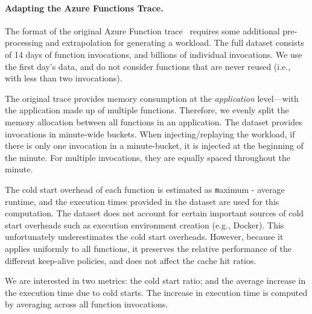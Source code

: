 \paragraph{Adapting the Azure Functions Trace.}
The format of the original Azure Function trace~\cite{shahrad_serverless_2020} requires some additional pre-processing and extrapolation for generating a workload.  
The full dataset consists of 14 days of function invocations, and billions of individual invocations. We use the first day's data, and do not consider functions that are never reused (i.e., with less than two invocations). 

The original trace provides memory consumption at the \textit{application} level---with the application made up of multiple functions.
Therefore, we evenly split the memory allocation between all functions in an application.
The dataset provides invocations in minute-wide buckets.
When injecting/replaying the workload, if there is only one invocation in a minute-bucket, it is injected at the beginning of the minute. 
For multiple invocations, they are equally spaced throughout the minute. 

%
The cold start overhead of each function is estimated as {\texttt maximum - average} runtime, and the execution times provided in the dataset are used for this computation. 
The dataset does not account for certain important sources of cold start overheads such as execution environment creation (e.g., Docker).
This unfortunately underestimates the cold start overheads.
However, because it applies uniformly to all functions, it preserves the relative performance of the different keep-alive policies, and does not affect the cache hit ratios. 
%



We are interested in two metrics: the cold start ratio; and the average increase in the execution time due to cold starts.
The increase in execution time is computed by averaging across all function invocations. 


